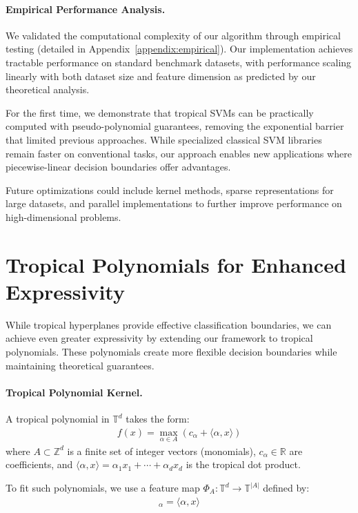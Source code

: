 \documentclass{article}
\newcommand{\R}{\mathbb{R}}
\newcommand{\trop}{\mathbb{T}}
\begin{document}
\paragraph{Empirical Performance Analysis.}
We validated the computational complexity of our algorithm through empirical testing (detailed in Appendix~\ref{appendix:empirical}). Our implementation achieves tractable performance on standard benchmark datasets, with performance scaling linearly with both dataset size and feature dimension as predicted by our theoretical analysis.

For the first time, we demonstrate that tropical SVMs can be practically computed with pseudo-polynomial guarantees, removing the exponential barrier that limited previous approaches. While specialized classical SVM libraries remain faster on conventional tasks, our approach enables new applications where piecewise-linear decision boundaries offer advantages.

Future optimizations could include kernel methods, sparse representations for large datasets, and parallel implementations to further improve performance on high-dimensional problems.

\section{Tropical Polynomials for Enhanced Expressivity}\label{sec:polynomials}

While tropical hyperplanes provide effective classification boundaries, we can achieve even greater expressivity by extending our framework to tropical polynomials. These polynomials create more flexible decision boundaries while maintaining theoretical guarantees.

\paragraph{Tropical Polynomial Kernel.}
A tropical polynomial in $\trop^d$ takes the form:
\begin{align}
f(x) = \max_{\alpha \in A} (c_\alpha + \langle \alpha, x \rangle)
\end{align}
where $A \subset \mathbb{Z}^d$ is a finite set of integer vectors (monomials), $c_\alpha \in \R$ are coefficients, and $\langle \alpha, x \rangle = \alpha_1 x_1 + \cdots + \alpha_d x_d$ is the tropical dot product.

To fit such polynomials, we use a feature map $\Phi_A: \trop^d \to \trop^{|A|}$ defined by:
\begin{align}
[\Phi_A(x)]_\alpha = \langle \alpha, x \rangle
\end{align}
\end{document}
